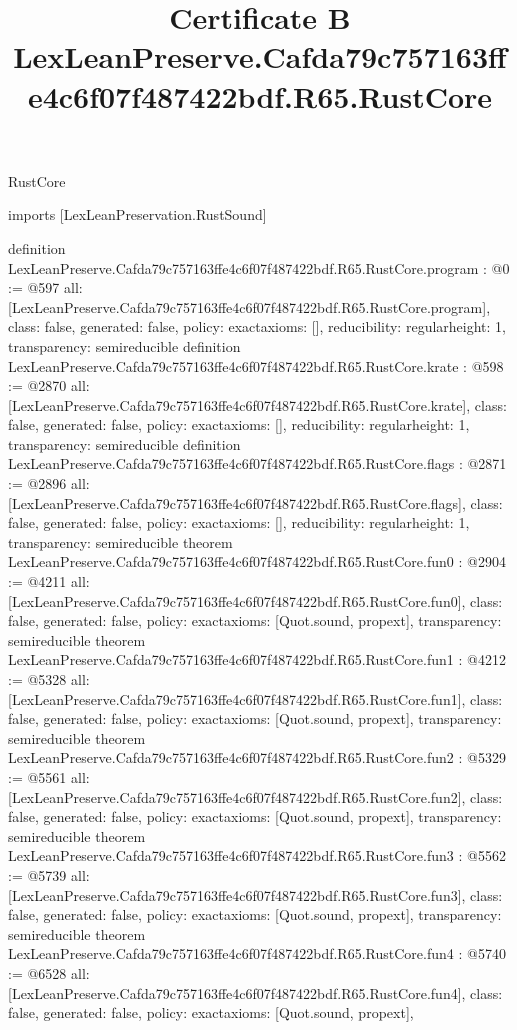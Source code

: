 \begin{lexlean}{RustCore}
\title{Certificate B LexLeanPreserve.Cafda79c757163ffe4c6f07f487422bdf.R65.RustCore}
\begin{coremodule}
imports [LexLeanPreservation.RustSound]

definition LexLeanPreserve.Cafda79c757163ffe4c6f07f487422bdf.R65.RustCore.program : @0 := @597 {
  all: [LexLeanPreserve.Cafda79c757163ffe4c6f07f487422bdf.R65.RustCore.program],
  class: false,
  generated: false,
  policy: exact{axioms: []},
  reducibility: regular{height: 1},
  transparency: semireducible
}
definition LexLeanPreserve.Cafda79c757163ffe4c6f07f487422bdf.R65.RustCore.krate : @598 := @2870 {
  all: [LexLeanPreserve.Cafda79c757163ffe4c6f07f487422bdf.R65.RustCore.krate],
  class: false,
  generated: false,
  policy: exact{axioms: []},
  reducibility: regular{height: 1},
  transparency: semireducible
}
definition LexLeanPreserve.Cafda79c757163ffe4c6f07f487422bdf.R65.RustCore.flags : @2871 := @2896 {
  all: [LexLeanPreserve.Cafda79c757163ffe4c6f07f487422bdf.R65.RustCore.flags],
  class: false,
  generated: false,
  policy: exact{axioms: []},
  reducibility: regular{height: 1},
  transparency: semireducible
}
theorem LexLeanPreserve.Cafda79c757163ffe4c6f07f487422bdf.R65.RustCore.fun0 : @2904 := @4211 {
  all: [LexLeanPreserve.Cafda79c757163ffe4c6f07f487422bdf.R65.RustCore.fun0],
  class: false,
  generated: false,
  policy: exact{axioms: [Quot.sound, propext]},
  transparency: semireducible
}
theorem LexLeanPreserve.Cafda79c757163ffe4c6f07f487422bdf.R65.RustCore.fun1 : @4212 := @5328 {
  all: [LexLeanPreserve.Cafda79c757163ffe4c6f07f487422bdf.R65.RustCore.fun1],
  class: false,
  generated: false,
  policy: exact{axioms: [Quot.sound, propext]},
  transparency: semireducible
}
theorem LexLeanPreserve.Cafda79c757163ffe4c6f07f487422bdf.R65.RustCore.fun2 : @5329 := @5561 {
  all: [LexLeanPreserve.Cafda79c757163ffe4c6f07f487422bdf.R65.RustCore.fun2],
  class: false,
  generated: false,
  policy: exact{axioms: [Quot.sound, propext]},
  transparency: semireducible
}
theorem LexLeanPreserve.Cafda79c757163ffe4c6f07f487422bdf.R65.RustCore.fun3 : @5562 := @5739 {
  all: [LexLeanPreserve.Cafda79c757163ffe4c6f07f487422bdf.R65.RustCore.fun3],
  class: false,
  generated: false,
  policy: exact{axioms: [Quot.sound, propext]},
  transparency: semireducible
}
theorem LexLeanPreserve.Cafda79c757163ffe4c6f07f487422bdf.R65.RustCore.fun4 : @5740 := @6528 {
  all: [LexLeanPreserve.Cafda79c757163ffe4c6f07f487422bdf.R65.RustCore.fun4],
  class: false,
  generated: false,
  policy: exact{axioms: [Quot.sound, propext]},
}
\end{coremodule}
\end{lexlean}
